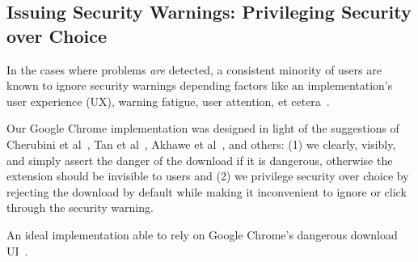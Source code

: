 \subsection{Issuing Security Warnings: Privileging Security over Choice}


In the cases where problems \emph{are} detected, a consistent minority of users
are known to ignore security warnings depending factors like an implementation's
user experience (UX), warning fatigue, user attention, et cetera~\cite{Modic,
Akhawe, ChromeClickThrough}.

Our Google Chrome implementation was designed in light of the suggestions of
Cherubini et al~\cite{Cherubini}, Tan et al~\cite{Tan}, Akhawe et
al~\cite{Akhawe}, and others: (1) we clearly, visibly, and simply assert the
danger of the download if it is dangerous, otherwise the extension should be
invisible to users and (2) we privilege security over choice by rejecting the
download by default while making it inconvenient to ignore or click through the
security warning.

An ideal implementation able to rely on Google Chrome's dangerous download
UI~\cite{ChromeClickThrough}.

